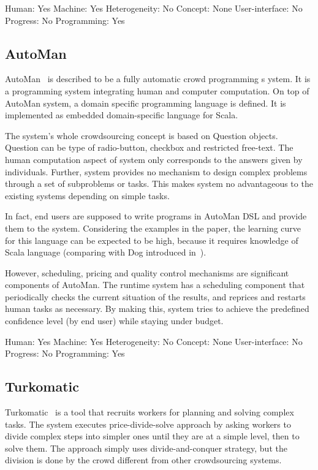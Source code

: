 Human: Yes
Machine: Yes
Heterogeneity: No
Concept: None
User-interface: No
Progress: No 
Programming: Yes

\subsection{AutoMan}
AutoMan~\cite{Barowy2012} is described to be a fully automatic crowd programming s
ystem. It is a programming system integrating human and computer computation. 
On top of AutoMan system, a domain specific programming language is defined. 
It is implemented as embedded domain-specific language for Scala.

The system's whole crowdsourcing concept is based on Question objects. 
Question can be type of radio-button, checkbox and restricted free-text. The human 
computation aspect of system only corresponds to the answers given by individuals. 
Further, system provides no mechanism to design complex problems through a 
set of subproblems or tasks. This makes system no advantageous to the 
existing systems depending on simple tasks.

In fact, end users are supposed to write programs in AutoMan DSL and provide 
them to the system. Considering the examples in the paper, the learning curve 
for this language can be expected to be high, because it requires knowledge 
of Scala language (comparing with Dog introduced in~\cite{Ahmad2011}).

However, scheduling, pricing and quality control mechanisms are significant 
components of AutoMan. The runtime system has a scheduling component that 
periodically checks the current situation of the results, and reprices and restarts 
human tasks as necessary. By making this, system tries to achieve the predefined 
confidence level (by end user) while staying under budget.

Human: Yes
Machine: Yes
Heterogeneity: No
Concept: None
User-interface: No
Progress: No
Programming: Yes

\subsection{Turkomatic}
Turkomatic~\cite{Kulkarni2012} is a tool that recruits workers for planning and 
solving complex tasks. The system executes price-divide-solve approach by 
asking workers to divide complex steps into simpler ones until they are at a simple 
level, then to solve them. The approach simply uses divide-and-conquer strategy, 
but the division is done by the crowd different from other crowdsourcing systems.

